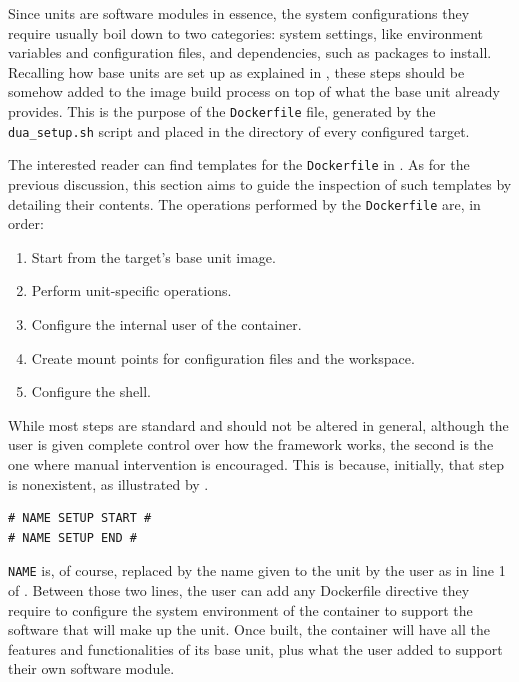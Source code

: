 Since units are software modules in essence, the system configurations they require usually boil down to two categories: system settings, like environment variables and configuration files, and dependencies, such as packages to install. Recalling how base units are set up as explained in , these steps should be somehow added to the image build process on top of what the base unit already provides. This is the purpose of the \texttt{Dockerfile} file, generated by the \texttt{dua\_setup.sh} script and placed in the directory of every configured target.

The interested reader can find templates for the \texttt{Dockerfile} in \cite{masocco_dua-template_nodate}. As for the previous discussion, this section aims to guide the inspection of such templates by detailing their contents. The operations performed by the \texttt{Dockerfile} are, in order:
\begin{enumerate}
  \item Start from the target's base unit image.
  \item Perform unit-specific operations.
  \item Configure the internal user of the container.
  \item Create mount points for configuration files and the workspace.
  \item Configure the shell.
\end{enumerate}
While most steps are standard and should not be altered in general, although the user is given complete control over how the framework works, the second is the one where manual intervention is encouraged. This is because, initially, that step is nonexistent, as illustrated by .
\begin{center}
\begin{minipage}[t]{.9\textwidth}
\begin{lstlisting}[caption=Unit configuration step in a Dockerfile as generated by the template., label={lst:imgsetup}]
# NAME SETUP START #
# NAME SETUP END #
\end{lstlisting}
\end{minipage}
\end{center}
\texttt{NAME} is, of course, replaced by the name given to the unit by the user as in line 1 of . Between those two lines, the user can add any Dockerfile directive they require to configure the system environment of the container to support the software that will make up the unit. Once built, the container will have all the features and functionalities of its base unit, plus what the user added to support their own software module.

